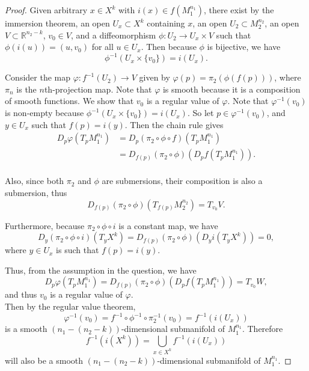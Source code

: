 \documentclass{article}
\begin{document}
\begin{enumerate}[label={\bf Q\arabic*:}]
    \begin{proof}
      Given arbitrary $x\in X^k$ with $i(x)\in f(M_1^{n_1})$, there exist
      by the immersion theorem, an open $U_x\subset X^k$ containing $x$, an
      open $U_2\subset M_2^{n_2}$, an open $V\subset\mathbb{R}^{n_2-k}$,
      $v_0\in V$, and a diffeomorphism $\phi:U_2\rightarrow U_x\times V$
      such that $\phi(i(u))=(u,v_0)$ for all $u\in U_x$. Then because
      $\phi$ is bijective, we have
      \[\phi^{-1}(U_x\times\{v_0\})=i(U_x).\]

      Consider the map $\varphi:f^{-1}(U_2)\rightarrow V$ given by
      $\varphi(p)=\pi_2(\phi(f(p)))$, where $\pi_n$ is the $n$th-projection
      map. Note that $\varphi$ is smooth because it is a composition of
      smooth functions. We show that $v_0$ is a regular value of $\varphi$.
      Note that $\varphi^{-1}(v_0)$ is non-empty because
      $\phi^{-1}(U_x\times\{v_0\})=i(U_x)$. So let $p\in\varphi^{-1}(v_0)$,
      and $y\in U_x$ such that $f(p)=i(y)$. Then the chain rule gives
      \begin{align*}
        D_p\varphi(T_pM_1^{n_1}) &=D_p(\pi_2\circ\phi\circ f)(T_pM_1^{n_1})
          \\
        &=D_{f(p)}(\pi_2\circ\phi)(D_pf(T_pM_1^{n_1})). \\
      \end{align*}

      Also, since both $\pi_2$ and $\phi$ are submersions, their
      composition is also a submersion, thus
      \[D_{f(p)}(\pi_2\circ\phi)(T_{f(p)}M_2^{n_2}) = T_{v_0}V.\]

      Furthermore, because $\pi_2\circ\phi\circ i$ is a constant map, we
      have
      \[D_y(\pi_2\circ\phi\circ i)(T_yX^k)
        =D_{f(p)}(\pi_2\circ\phi)(D_yi(T_yX^k)) =0,\]
      where $y\in U_x$ is such that $f(p)=i(y)$.

      Thus, from the assumption in the question, we have
      \[D_p\varphi(T_pM_1^{n_1})=
      D_{f(p)}(\pi_2\circ\phi)(D_pf(T_pM_1^{n_1})) =T_{v_0}W,\]
      and thus $v_0$ is a regular value of $\varphi$. \\

      Then by the regular value theorem,
      \[\varphi^{-1}(v_0) =f^{-1}\circ\phi^{-1}\circ\pi_2^{-1}(v_0)
      =f^{-1}(i(U_x))\]
      is a smooth $(n_1-(n_2-k))$-dimensional submanifold of $M_1^{n_1}$.
      Therefore
      \[f^{-1}(i(X^k))=\bigcup_{x\in X^k} f^{-1}(i(U_x))\]
      will also be a smooth $(n_1-(n_2-k))$-dimensional submanifold of
      $M_1^{n_1}$.
    \end{proof}


\end{enumerate}
\end{document}
